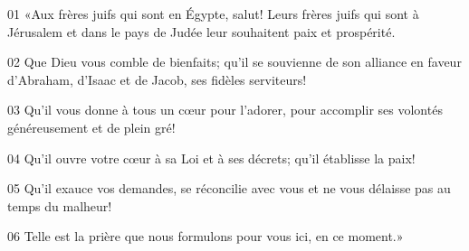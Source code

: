 01 «Aux frères juifs qui sont en Égypte, salut! Leurs frères juifs qui sont à Jérusalem et dans le pays de Judée leur souhaitent paix et prospérité.

02 Que Dieu vous comble de bienfaits; qu’il se souvienne de son alliance en faveur d’Abraham, d’Isaac et de Jacob, ses fidèles serviteurs!

03 Qu’il vous donne à tous un cœur pour l’adorer, pour accomplir ses volontés généreusement et de plein gré!

04 Qu’il ouvre votre cœur à sa Loi et à ses décrets; qu’il établisse la paix!

05 Qu’il exauce vos demandes, se réconcilie avec vous et ne vous délaisse pas au temps du malheur!

06 Telle est la prière que nous formulons pour vous ici, en ce moment.»